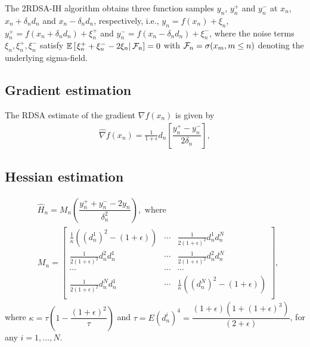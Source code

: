 \documentclass[letterpaper, 10 pt, conference]{ieeeconf}  %
\begin{document}
The 2RDSA-IH algorithm obtains three function samples $y_n$, $y_n^+$ and $y_n^-$ at $x_n$, $x_n+\delta_n d_n$ and $x_n - \delta_n d_n$, respectively, i.e.,
$y_n = f(x_n) + \xi_n$, $y_n^+ = f(x_n+\delta_n d_n) + \xi_n^+$ and 
$y_n^- = f(x_n-\delta_n d_n) + \xi_n^-$,
where the noise terms $\xi_n, \xi_n^+, \xi_n^-$ satisfy $\mathbb{E}\left[\left.\xi_n^+ + \xi_n^- - 2\xi_n \right| \mathcal{F}_n\right] = 0$ with $\mathcal{F}_n = \sigma(x_m,m\le n)$ denoting the underlying sigma-field. 

\subsection{Gradient estimation}
The RDSA estimate of the gradient $\nabla f(x_n)$ is given by
\begin{align}
\label{eq:grad-ber}
\widehat\nabla f(x_n) = \frac1{1+\epsilon} d_n \left[ \dfrac{y_n^+ - y_n^-}{2\delta_n}\right],
\end{align}

\subsection{Hessian estimation}
\begin{align}
\label{eq:2rdsa-estimate-ber}
&\widehat H_n = M_n \left(\dfrac{y_n^+ + y_n^- - 2 y_n}{\delta_n^2}\right), \text{ where }\\
& M_n =
\left[
\begin{array}{ccc}
\frac{1}{\kappa}\left((d_n^1)^2\!-(1+\epsilon)\right) & \cdots & \frac{1}{2(1+\epsilon)^2}d_n^1 d_n^N\\
\frac{1}{2(1+\epsilon)^2}d_n^2 d_n^1  &  \cdots & \frac{1}{2(1+\epsilon)^2}d_n^2 d_n^N\\
\cdots&\cdots&\cdots\\
\frac{1}{2(1+\epsilon)^2}d_n^N d_n^1 & \cdots &  \frac{1}{\kappa}\left((d_n^N)^2-(1+\epsilon)\right) \\
\end{array}
\right],\nonumber
\end{align}
where $\kappa = \tau \left(1- \dfrac{(1+\epsilon)^2}{\tau}\right)$ and $\tau = E (d_n^i)^4= \dfrac{(1+\epsilon)(1+(1+\epsilon)^3)}{(2+\epsilon)}$, for any $i=1,\ldots,N$. 
\end{document}
